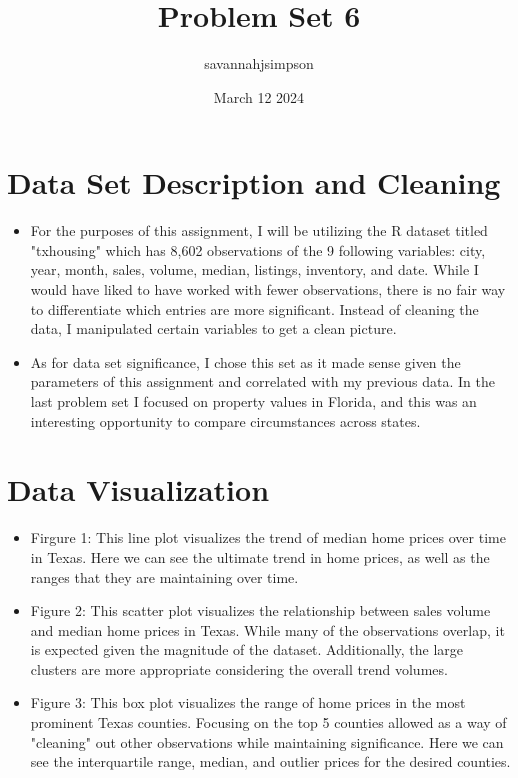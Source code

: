 \documentclass{article}
\title{Problem Set 6}
\author{savannahjsimpson }
\date{March 12 2024}
\begin{document}
\maketitle

\section{Data Set Description and Cleaning }
\begin{itemize}
\item For the purposes of this assignment, I will be utilizing the R dataset titled "txhousing" which has 8,602 observations of the 9 following variables: city, year, month, sales, volume, median, listings, inventory, and date. While I would have liked to have worked with fewer observations, there is no fair way to differentiate which entries are more significant. Instead of cleaning the data, I manipulated certain variables to get a clean picture. 
\item As for data set significance, I chose this set as it made sense given the parameters of this assignment and correlated with my previous data. In the last problem set I focused on property values in Florida, and this was an interesting opportunity to compare circumstances across states. 
\end{itemize}

\section{Data Visualization}
\begin{itemize}
\item Firgure 1: This line plot visualizes the trend of median home prices over time in Texas. Here we can see the ultimate trend in home prices, as well as the ranges that they are maintaining over time. 
\item Figure 2: This scatter plot visualizes the relationship between sales volume and median home prices in Texas. While many of the observations overlap, it is expected given the magnitude of the dataset. Additionally, the large clusters are more appropriate considering the overall trend volumes. 
\item Figure 3: This box plot visualizes the range of home prices in the most prominent Texas counties. Focusing on the top 5 counties allowed as a way of "cleaning" out other observations while maintaining significance. Here we can see the interquartile range, median, and outlier prices for the desired counties. 
\end{itemize}
\end{document}
